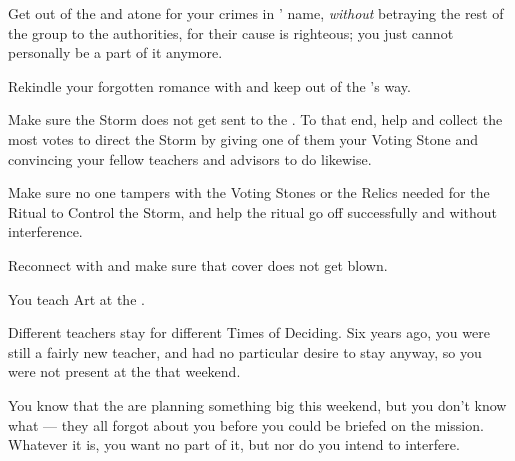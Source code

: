 \documentclass[char]{GL2020}
\begin{document}
\begin{itemz}
    \item Get out of the \pGoaties{} and atone for your crimes in \cGenesis{}' name, \emph{without} betraying the rest of the group to the authorities, for their cause is righteous; you just cannot personally be a part of it anymore.
    \item Rekindle your forgotten romance with \cHeadScientist{} and keep \cHeadScientist{\them} out of the \pGoaties{}'s way.
    \item Make sure the Storm does not get sent to the \pShip{}. To that end, help \cInitiate{} and \cPirateChild{} collect the most votes to direct the Storm by giving one of them your Voting Stone and convincing your fellow teachers and advisors to do likewise.
    \item Make sure no one tampers with the Voting Stones or the Relics needed for the Ritual to Control the Storm, and help the ritual go off successfully and without interference.
    \item Reconnect with \cAssistantScientist{} and make sure that \cAssistantScientist{\their} cover does not get blown. 
\end{itemz}

\begin{itemz}[Notes]
    \item You teach Art at the \pSchool{}.
    \item Different teachers stay for different Times of Deciding. Six years ago, you were still a fairly new teacher, and had no particular desire to stay anyway, so you were not present at the \pSc{} that weekend.
    \item You know that the \pGoaties{} are planning something big this weekend, but you don't know what — they all forgot about you before you could be briefed on the mission. Whatever it is, you want no part of it, but nor do you intend to interfere.
\end{itemz}
\end{document}
